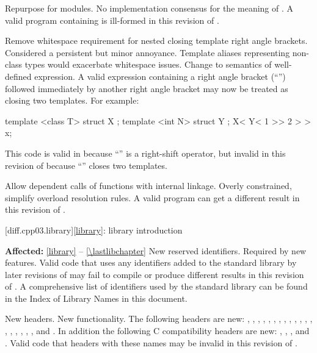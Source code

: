 \change
Repurpose  for modules.
\rationale
No implementation consensus for the \CppIII{} meaning of .
\effect
A valid \CppIII{} program containing  is ill-formed in this
revision of \Cpp{}.

\change
Remove whitespace requirement for nested closing template right angle
brackets.
\rationale
Considered a persistent but minor annoyance. Template aliases
representing non-class types would exacerbate whitespace issues.
\effect
Change to semantics of well-defined expression. A valid \CppIII{} expression
containing a right angle bracket (``\tcode{>}'') followed immediately by
another right angle bracket may now be treated as closing two templates.
For example:
\begin{codeblock}
template <class T> struct X { };
template <int N> struct Y { };
X< Y< 1 >> 2 > > x;
\end{codeblock}
This code is valid in \CppIII{} because ``\tcode{>>}''
is a right-shift operator, but invalid in this revision of \Cpp{} because
``\tcode{>>}'' closes two templates.

\change
Allow dependent calls of functions with internal linkage.
\rationale
Overly constrained, simplify overload resolution rules.
\effect
A valid \CppIII{} program can get a different result in this
revision of \Cpp{}.

[diff.cpp03.library]{\ref{library}: library introduction}

\pnum
\textbf{Affected:} \ref{library} -- \ref{\lastlibchapter}
\change
New reserved identifiers.
\rationale
Required by new features.
\effect
Valid \CppIII{} code that uses any identifiers added to the \Cpp{} standard
library by later revisions of \Cpp{} may fail to compile or produce different
results in this revision of \Cpp{}. A comprehensive list of identifiers used
by the \Cpp{} standard library can be found in the Index of Library Names in this
document.

\change
New headers.
\rationale
New functionality.
\effect
The following \Cpp{} headers are new:
,
,
,
,
,
,
,
,
,
,
,
,
,
,
,
,
,
,
,
and
.
In addition the following C compatibility headers are new:
,
,
,
and
.
Valid \CppIII{} code that  headers with these names may be
invalid in this revision of \Cpp{}.

